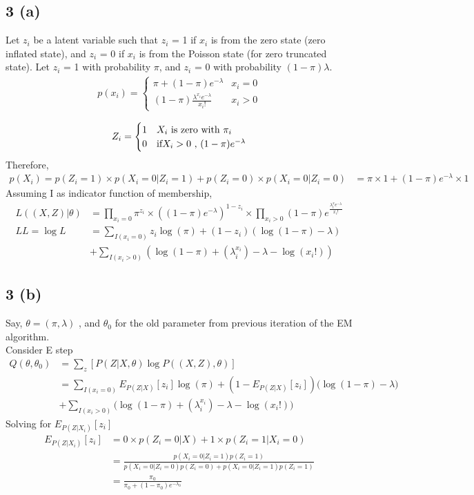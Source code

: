 \documentclass[10pt,letterpaper]{article}
\begin{document}
\subsection{3 (a) }

		Let $z_i$ be a latent variable such that $z_i$ = 1 if $x_i$ is from the zero state (zero inflated state), and $z_i$ = 0 if $x_i$ is from the Poisson state (for zero truncated state). Let $z_i$ = 1 with probability $\pi$, and $z_i$ = 0 with probability $(1 - \pi) \lambda$.		
		\begin{align*}
		p(x_i) = \begin{cases}
		\pi+(1-\pi)e^{-\lambda} & x_i=0\\
		(1-\pi)\frac{\lambda^{x_i}e^{-\lambda}}{x_i!} & x_i>0
		\end{cases}
		\end{align*}
		
		\begin{align*}
		Z_i = \begin{cases}
		1 &  \text{$X_i$ is zero with $\pi_i$  }\\
		0 & \text{if$ X_i >0$ , $  (1-\pi){e^{-\lambda}}$}
		\end{cases}
		\end{align*}
		Therefore,\\
		\begin{align*}
		p(X_i) = p(Z_i=1) \times p(X_i=0|Z_i=1) +  p(Z_i=0) \times p(X_i=0|Z_i=0) 
		&= \pi \times 1 + (1-\pi)e^{-\lambda} \times 1
		\end{align*}
		Assuming I as indicator function of membership,
		\begin{align*}
		L((X,Z)|\theta) &= \prod_{x_i=0} \pi^{z_i} \times ((1-\pi)e^{-\lambda})^{1-z_i} \times \prod_{x_i > 0} (1-\pi)e^\frac{\lambda^x_i e^{-\lambda}}{x_i!}\\
		LL=\log L &= \sum_{I(x_i=0)} z_i \log(\pi) + (1-z_i) ( \log(1-\pi) - \lambda )\\  &+ \sum_{I(x_i>0)} ( \log(1-\pi) + (\lambda_i^{x_i}) - \lambda - \log(x_i!) )
		\end{align*}
\subsection{3 (b) }		
		Say, $\theta = (\pi, \lambda)$ , and $\theta_0$ for the old parameter from previous iteration of the EM algorithm.\\	
Consider E step 		
\begin{align*}	
Q(\theta, \theta_0) &= \sum_z [P(Z|X,\theta) \log P((X,Z),\theta)]\\
	&= \sum_{I(x_i=0)} E_{P(Z|X)}[z_i] \log(\pi) + (1-E_{P(Z|X)}[z_i]) \big( \log(1-\pi) - \lambda \big)\\  
		&+ \sum_{I(x_i>0)} \big( \log(1-\pi) + (\lambda_i^{x_i}) - \lambda - \log(x_i!) \big)
\end{align*}
Solving for $E_{P(Z|X_i)}[z_i]$
\begin{align*}	
E_{P(Z|X_i)}[z_i] &= 0 \times p(Z_i=0|X) + 1 \times p(Z_i=1|X_i=0) \\
&= \frac{p(X_i=0|Z_i=1)p(Z_i=1)}{p(X_i=0|Z_i=0)p(Z_i=0)+p(X_i=0|Z_i=1)p(Z_i=1)}\\
&= \frac{\pi_0}{\pi_0+(1-\pi_0)e^{-\lambda_0}}
\end{align*}
\end{document}
